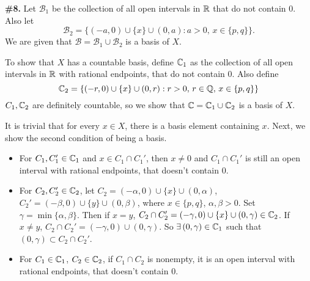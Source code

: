 \documentclass[a4paper,11pt]{article}
\newcommand{\B}{\mathcal{B}}
\begin{document}
\begin{minipage}[t][270mm]{90mm}
    {\bfseries \large \#8.} Let \(\B_1\) be the collection of all open intervals in \(\mathbb{R}\) that do not contain \(0\). Also let
    \[
        \B_2 = \{(-a, 0) \cup \{x\} \cup (0, a) : a > 0,\, x \in \{p
    , q\}\}.
    \]
    We are given that \(\B = \B_1 \cup \B_2\) is a basis of \(X\).

    To show that \(X\) has a countable basis, define \(\mathbb{C}_1\) as the collection of all open intervals in \(\mathbb{R}\) with rational endpoints, that do not contain \(0\). Also define
    \[
        \mathbb{C}_2 = \{(-r, 0) \cup \{x\} \cup (0, r) : r > 0,\, r \in \mathbb{Q},\, x \in \{p, q\}\}
    \]
    \(C_1, \mathbb{C}_2\) are definitely countable, so we show that \(\mathbb{C} = \mathbb{C}_1 \cup \mathbb{C}_2\) is a basis of \(X\).

    It is trivial that for every \(x \in X\), there is a basis element containing \(x\). Next, we show the second condition of being a basis.
    \begin{itemize}
        \item For \(C_1, C_1' \in \mathbb{C}_1\) and \(x \in C_1 \cap C_1'\), then \(x \neq 0\) and \(C_1 \cap C_1'\) is still an open interval with rational endpoints, that doesn't contain \(0\).

        \item For \(C_2, C_2' \in \mathbb{C}_2\), let \(C_2 = (-\alpha, 0) \cup \{x\} \cup (0, \alpha)\), \(C_2' = (-\beta, 0) \cup \{y\} \cup (0, \beta)\), where \(x \in \{p, q\}\), \(\alpha, \beta > 0\). Set \(\gamma = \min\{\alpha, \beta\}\). Then if \(x = y\), \(C_2 \cap C_2' = (-\gamma, 0) \cup \{x\} \cup (0, \gamma) \in \mathbb{C}_2\). If \(x \neq y\), \(C_2 \cap C_2' = (-\gamma, 0) \cup (0, \gamma)\). So \(\exists (0, \gamma) \in \C_1\) such that \((0, \gamma) \subset C_2 \cap C_2'\).

        \item For \(C_1 \in \mathbb{C}_1\), \(C_2 \in \mathbb{C}_2\), if \(C_1 \cap C_2\) is nonempty, it is an open interval with rational endpoints, that doesn't contain \(0\).
    \end{itemize}

\end{minipage}
{\color{gray}\vline}
\end{document}
